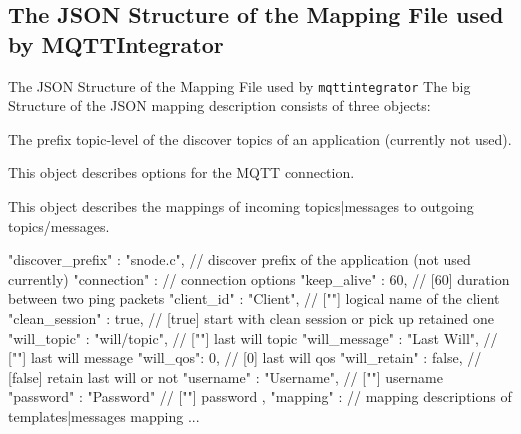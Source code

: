 ﻿\subsection{The \alert{JSON Structure} of the Mapping File used by MQTTIntegrator}

\begin{frame}[fragile]{The \alert{JSON Structure} of the Mapping File used by \alert{\texttt{mqttintegrator}}}
  The big Structure of the JSON mapping description consists of three objects:
  \begin{description}
    \item[discover\_prefix] The prefix topic-level of the discover topics of an application (currently not used).
    \item[connection] This object describes options for the MQTT connection.
    \item[mapping] This object describes the mappings of incoming topics|messages to outgoing topics/messages.
  \end{description}

  \begin{jsoncode}[gobble=4]
    {
        "discover_prefix" : "snode.c",         // discover prefix of the application (not used currently)
        "connection" : {                       // connection options
            "keep_alive" : 60,                 // [60]    duration between two ping packets
            "client_id" : "Client",            // [""]    logical name of the client
            "clean_session" : true,            // [true]  start with clean session or pick up retained one
            "will_topic" : "will/topic",       // [""]    last will topic
            "will_message" : "Last Will",      // [""]    last will message
            "will_qos": 0,                     // [0]     last will qos
            "will_retain" : false,             // [false] retain last will or not
            "username" : "Username",           // [""]    username
            "password" : "Password"            // [""]    password
        },
        "mapping" : {                          // mapping descriptions of templates|messages mapping
            ...
        }
    }
  \end{jsoncode}
\end{frame}

